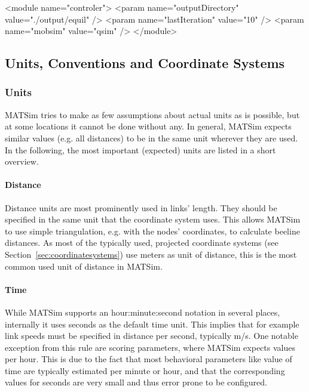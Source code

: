 \begin{xml}
<module name="controler">
	<param name="outputDirectory" value="./output/equil" />
	<param name="lastIteration" value="10" />
	<param name="mobsim" value="qsim" />	
</module>
\end{xml}

\subsection{Units, Conventions and Coordinate Systems}
\label{sec:unitsconventions}
\subsubsection{Units}
MATSim tries to make as few assumptions about actual units as is possible, but at some locations it cannot be done without any. In general, MATSim expects similar values (e.g. all distances) to be in the same unit wherever they are used. In the following, the most important (expected) units are listed in a short overview. 

\paragraph{Distance}

Distance units are most prominently used in links' length. They should be specified in the same unit that the coordinate system uses. This allows MATSim to use simple triangulation, e.g. with the nodes' coordinates, to calculate beeline distances. As most of the typically used, projected coordinate systems (see Section~\ref{sec:coordinatesystems}) use meters as unit of distance, this is the most common used unit of distance in MATSim. 

\paragraph{Time}

While MATSim supports an hour:minute:second notation in several places, internally it uses seconds as the default time unit. This implies that for example link speeds must be specified in distance per second, typically m/s. One notable exception from this rule are scoring parameters, where MATSim expects values per hour. This is due to the fact that most behavioral parameters like value of time are typically estimated per minute or hour, and that the corresponding values for seconds are very small and thus error prone to be configured. 

